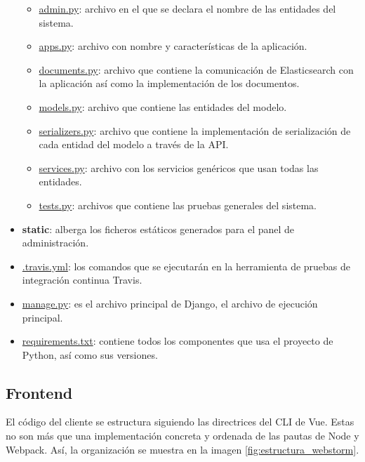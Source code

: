 \begin{itemize}
\begin{itemize}
        \item \underline{admin.py}: archivo en el que se declara el nombre de las entidades del sistema.
        \item \underline{apps.py}: archivo con nombre y características de la aplicación.
        \item \underline{documents.py}: archivo que contiene la comunicación de Elasticsearch con la aplicación así como la implementación de los documentos.
        \item \underline{models.py}: archivo que contiene las entidades del modelo.
        \item \underline{serializers.py}: archivo que contiene la implementación de serialización de cada entidad del modelo a través de la API.
        \item \underline{services.py}: archivo con los servicios genéricos que usan todas las entidades.
        \item \underline{tests.py}: archivos que contiene las pruebas generales del sistema.
    \end{itemize}
    \item \textbf{static}: alberga los ficheros estáticos generados para el panel de administración.
    \item \underline{.travis.yml}: los comandos que se ejecutarán en la herramienta de pruebas de integración continua Travis.
    \item \underline{manage.py}: es el archivo principal de Django, el archivo de ejecución principal.
    \item \underline{requirements.txt}: contiene todos los componentes que usa el proyecto de Python, así como sus versiones.
\end{itemize}

\subsection{Frontend}

El código del cliente se estructura siguiendo las directrices del CLI de Vue. Estas no son más que una implementación concreta y ordenada de las pautas de Node y Webpack. Así, la organización se muestra en la imagen \ref{fig:estructura_webstorm}.


